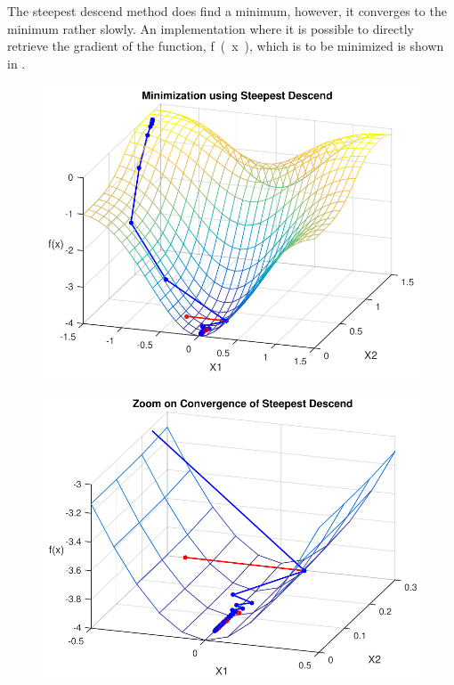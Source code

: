 The steepest descend method does find a minimum, however, it converges to the minimum rather slowly. An implementation where it is possible to directly retrieve the gradient of the function, \si{f(x)}, which is to be minimized is shown in .

\begin{minipage}{\linewidth}
	\begin{minipage}{0.45\linewidth}
		\begin{figure}[H]
			\includegraphics[scale=.6]{figures/steepestDescendEx}
			\centering
			\captionsetup{justification=centering}
			\label{steepestDescendEx}
		\end{figure}
	\end{minipage}
	\hspace{0.03\linewidth}
	\begin{minipage}{0.45\linewidth}
		\begin{figure}[H]
			\includegraphics[scale=.6]{figures/steepestDesendExZoom}

\end{figure}
\end{minipage}
\end{minipage}
